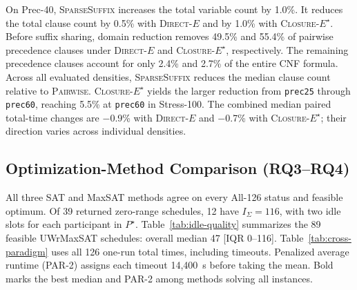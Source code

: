 \documentclass[conference,a4paper]{IEEEtran}
\newcommand{\revised}[1]{#1}
\newenvironment{revisionblock}{}{}
\begin{document}
\revised{On Prec-40, \mbox{\textnormal{\textsc{SparseSuffix}}} increases the total variable count by 1.0\%.  It reduces the total clause count by 0.5\% with \mbox{\textnormal{\textsc{Direct-}}\ensuremath{E}} and by 1.0\% with \mbox{\textnormal{\textsc{Closure-}}\ensuremath{E^\star}}.  Before suffix sharing, domain reduction removes 49.5\% and 55.4\% of pairwise precedence clauses under \mbox{\textnormal{\textsc{Direct-}}\ensuremath{E}} and \mbox{\textnormal{\textsc{Closure-}}\ensuremath{E^\star}}, respectively.  The remaining precedence clauses account for only 2.4\% and 2.7\% of the entire CNF formula. Across all evaluated densities, \mbox{\textnormal{\textsc{SparseSuffix}}} reduces the median clause count relative to \mbox{\textnormal{\textsc{Pairwise}}}.  \mbox{\textnormal{\textsc{Closure-}}\ensuremath{E^\star}} yields the larger reduction from \texttt{prec25} through \texttt{prec60}, reaching 5.5\% at \texttt{prec60} in Stress-100.  The combined median paired total-time changes are \ensuremath{-}0.9\% with \mbox{\textnormal{\textsc{Direct-}}\ensuremath{E}} and \ensuremath{-}0.7\% with \mbox{\textnormal{\textsc{Closure-}}\ensuremath{E^\star}}; their direction varies across individual densities.}

\subsection{Optimization-Method Comparison (RQ3--RQ4)}

\revised{All three SAT and MaxSAT methods agree on every All-126 status and feasible optimum. Of 39 returned zero-range schedules, 12 have $I_\Sigma=116$, with two idle slots for each participant in $P^\star$. Table~\ref{tab:idle-quality} summarizes the 89 feasible UWrMaxSAT schedules: overall median 47 [IQR 0--116]. Table~\ref{tab:cross-paradigm} uses all 126 one-run total times, including timeouts. Penalized average runtime (PAR-2) assigns each timeout 14{,}400~s before taking the mean. Bold marks the best median and PAR-2 among methods solving all instances.}

\begin{table}[t]
\begin{revisionblock}
\caption{Aggregate Idle in the 89 Range-Optimal UWrMaxSAT Schedules}
\label{tab:idle-quality}
\footnotesize
\setlength{\tabcolsep}{3pt}

%
\end{revisionblock}
\end{table}
\end{document}
